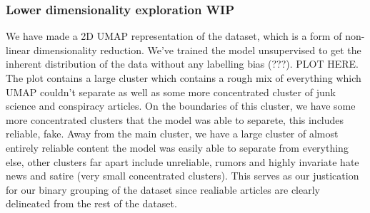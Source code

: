 \subsubsection{Lower dimensionality exploration WIP}
We have made a 2D UMAP representation of the dataset, which is a form of non-linear dimensionality reduction. We've trained the model unsupervised to get the inherent distribution of the data without any labelling bias (???). PLOT HERE. The plot contains a large cluster which contains a rough mix of everything which UMAP couldn't separate as well as some more concentrated cluster of junk science and conspiracy articles. On the boundaries of this cluster, we have some more concentrated clusters that the model was able to separete, this includes reliable, fake. Away from the main cluster, we have a large cluster of almost entirely reliable content the model was easily able to separate from everything else, other clusters far apart include unreliable, rumors and highly invariate hate news and satire (very small concentrated clusters). This serves as our justication for our binary grouping of the dataset since realiable articles are clearly delineated from the rest of the dataset. 



